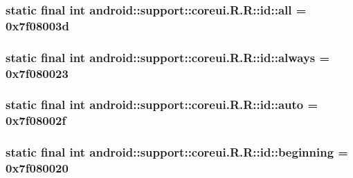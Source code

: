 \hypertarget{classandroid_1_1support_1_1coreui_1_1_r_1_1id_1489394fd8c89bfc540356ef0707668c}{
\subsubsection[{all}]{\setlength{\rightskip}{0pt plus 5cm}static final int android::support::coreui.R.R::id::all = 0x7f08003d}}
\label{classandroid_1_1support_1_1coreui_1_1_r_1_1id_1489394fd8c89bfc540356ef0707668c}


\hypertarget{classandroid_1_1support_1_1coreui_1_1_r_1_1id_3df56453913f3f403a4fd1a9e3bd50d4}{
\subsubsection[{always}]{\setlength{\rightskip}{0pt plus 5cm}static final int android::support::coreui.R.R::id::always = 0x7f080023}}
\label{classandroid_1_1support_1_1coreui_1_1_r_1_1id_3df56453913f3f403a4fd1a9e3bd50d4}


\hypertarget{classandroid_1_1support_1_1coreui_1_1_r_1_1id_470722c9af1d1cac110554b1d1c93332}{
\subsubsection[{auto}]{\setlength{\rightskip}{0pt plus 5cm}static final int android::support::coreui.R.R::id::auto = 0x7f08002f}}
\label{classandroid_1_1support_1_1coreui_1_1_r_1_1id_470722c9af1d1cac110554b1d1c93332}


\hypertarget{classandroid_1_1support_1_1coreui_1_1_r_1_1id_4eb43a9e47df06a48e40a376614294c6}{
\subsubsection[{beginning}]{\setlength{\rightskip}{0pt plus 5cm}static final int android::support::coreui.R.R::id::beginning = 0x7f080020}}
\label{classandroid_1_1support_1_1coreui_1_1_r_1_1id_4eb43a9e47df06a48e40a376614294c6}


